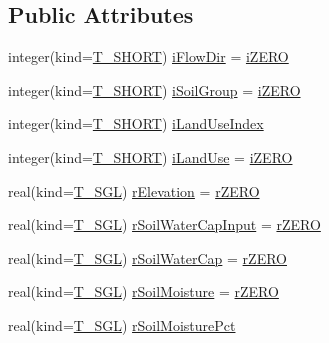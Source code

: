 \subsection*{Public Attributes}
\begin{DoxyCompactItemize}
\item 
integer(kind=\hyperlink{namespacetest_a78d9db20f77ee4f9cf3ac5abfb7062b9}{T\_\-SHORT}) \hyperlink{typetest_1_1_t___c_e_l_l_a87c1f47ab3a9eb3571574ea9d8bdd25c}{iFlowDir} = \hyperlink{namespacetest_a3014c474a511a7853327d17f396fea73}{iZERO}
\item 
integer(kind=\hyperlink{namespacetest_a78d9db20f77ee4f9cf3ac5abfb7062b9}{T\_\-SHORT}) \hyperlink{typetest_1_1_t___c_e_l_l_adb1b85c6578fcf90e12c8a4200bbb8a8}{iSoilGroup} = \hyperlink{namespacetest_a3014c474a511a7853327d17f396fea73}{iZERO}
\item 
integer(kind=\hyperlink{namespacetest_a78d9db20f77ee4f9cf3ac5abfb7062b9}{T\_\-SHORT}) \hyperlink{typetest_1_1_t___c_e_l_l_ad239019dcd29e3373497a82bc48f310d}{iLandUseIndex}
\item 
integer(kind=\hyperlink{namespacetest_a78d9db20f77ee4f9cf3ac5abfb7062b9}{T\_\-SHORT}) \hyperlink{typetest_1_1_t___c_e_l_l_aeffdf08d20c284018bf745a8f5ad008c}{iLandUse} = \hyperlink{namespacetest_a3014c474a511a7853327d17f396fea73}{iZERO}
\item 
real(kind=\hyperlink{namespacetest_a04d8b9090502de3a00046fe904bc3d99}{T\_\-SGL}) \hyperlink{typetest_1_1_t___c_e_l_l_aa101ba1a9b7cc92af49b61177137b4bc}{rElevation} = \hyperlink{namespacetest_a9bd8aefd97474e9bd8eb52d36c5d1ea2}{rZERO}
\item 
real(kind=\hyperlink{namespacetest_a04d8b9090502de3a00046fe904bc3d99}{T\_\-SGL}) \hyperlink{typetest_1_1_t___c_e_l_l_ad00429103ddaa3a7b05c970047b263a5}{rSoilWaterCapInput} = \hyperlink{namespacetest_a9bd8aefd97474e9bd8eb52d36c5d1ea2}{rZERO}
\item 
real(kind=\hyperlink{namespacetest_a04d8b9090502de3a00046fe904bc3d99}{T\_\-SGL}) \hyperlink{typetest_1_1_t___c_e_l_l_aa0733d39a1e7d03f3e6aa3a4d0270865}{rSoilWaterCap} = \hyperlink{namespacetest_a9bd8aefd97474e9bd8eb52d36c5d1ea2}{rZERO}
\item 
real(kind=\hyperlink{namespacetest_a04d8b9090502de3a00046fe904bc3d99}{T\_\-SGL}) \hyperlink{typetest_1_1_t___c_e_l_l_a7b9a3dc790903d4b2637f47b1ad273c1}{rSoilMoisture} = \hyperlink{namespacetest_a9bd8aefd97474e9bd8eb52d36c5d1ea2}{rZERO}
\item 
real(kind=\hyperlink{namespacetest_a04d8b9090502de3a00046fe904bc3d99}{T\_\-SGL}) \hyperlink{typetest_1_1_t___c_e_l_l_a0685f8e80f87ae9788c374a8c672e23a}{rSoilMoisturePct}

\end{DoxyCompactItemize}
